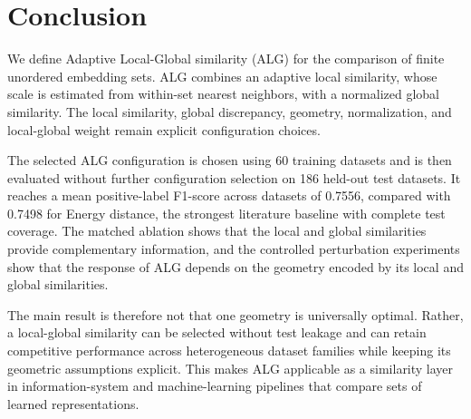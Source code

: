 \documentclass[preprint,12pt]{elsarticle}
\begin{document}
\section{Conclusion}
\label{sec:conclusion}

We define Adaptive Local-Global similarity (ALG) for the comparison of finite
unordered embedding sets. ALG combines an adaptive local similarity, whose
scale is estimated from within-set nearest neighbors, with a normalized global
similarity. The local similarity, global discrepancy, geometry, normalization,
and local-global weight remain explicit configuration choices.

The selected ALG configuration is chosen using 60 training datasets and is
then evaluated without further configuration selection on 186 held-out test
datasets. It reaches a mean positive-label F1-score across datasets of 0.7556,
compared with
0.7498 for Energy distance, the strongest literature baseline with complete test
coverage. The matched ablation shows that the local and global similarities
provide complementary information, and the controlled perturbation experiments
show that the response of ALG depends on the geometry encoded by its local and global similarities.

The main result is therefore not that one geometry is universally optimal.
Rather, a local-global similarity can be selected without test leakage and can
retain competitive performance across heterogeneous dataset families while
keeping its geometric assumptions explicit. This makes ALG applicable as a
similarity layer in information-system and machine-learning pipelines that
compare sets of learned representations.



% 

\end{document}
